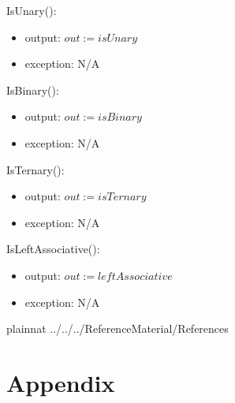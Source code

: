 \documentclass[12pt, titlepage]{article}
\begin{document}
\noindent IsUnary():
\begin{itemize}
	\item output: $out := isUnary$
	\item exception: N/A
\end{itemize}

\noindent IsBinary():
\begin{itemize}
	\item output: $out := isBinary$
	\item exception: N/A
\end{itemize}

\noindent IsTernary():
\begin{itemize}
	\item output: $out := isTernary$
	\item exception: N/A
\end{itemize}

\noindent IsLeftAssociative():
\begin{itemize}
	\item output: $out := leftAssociative$
	\item exception: N/A
\end{itemize}

\newpage

 {plainnat}
 {../../../ReferenceMaterial/References}

\newpage

\section{Appendix} \label{Appendix}

\renewcommand{\arraystretch}{1.2}
\end{document}

